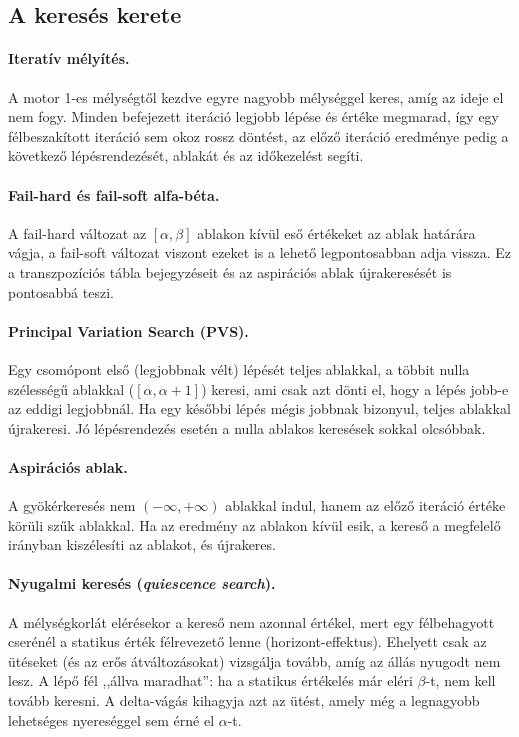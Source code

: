 \subsection{A keresés kerete}

\paragraph{Iteratív mélyítés.} A motor 1-es mélységtől kezdve egyre nagyobb mélységgel keres, amíg az ideje el nem fogy. Minden befejezett iteráció legjobb lépése és értéke megmarad, így egy félbeszakított iteráció sem okoz rossz döntést, az előző iteráció eredménye pedig a következő lépésrendezését, ablakát és az időkezelést segíti.

\paragraph{Fail-hard és fail-soft alfa-béta.} A fail-hard változat az $[\alpha, \beta]$ ablakon kívül eső értékeket az ablak határára vágja, a fail-soft változat viszont ezeket is a lehető legpontosabban adja vissza. Ez a transzpozíciós tábla bejegyzéseit és az aspirációs ablak újrakeresését is pontosabbá teszi.

\paragraph{Principal Variation Search (PVS).} Egy csomópont első (legjobbnak vélt) lépését teljes ablakkal, a többit nulla szélességű ablakkal ($[\alpha, \alpha+1]$) keresi, ami csak azt dönti el, hogy a lépés jobb-e az eddigi legjobbnál. Ha egy későbbi lépés mégis jobbnak bizonyul, teljes ablakkal újrakeresi. Jó lépésrendezés esetén a nulla ablakos keresések sokkal olcsóbbak.

\paragraph{Aspirációs ablak.} A gyökérkeresés nem $(-\infty, +\infty)$ ablakkal indul, hanem az előző iteráció értéke körüli szűk ablakkal. Ha az eredmény az ablakon kívül esik, a kereső a megfelelő irányban kiszélesíti az ablakot, és újrakeres.

\paragraph{Nyugalmi keresés (\emph{quiescence search}).} A mélységkorlát elérésekor a kereső nem azonnal értékel, mert egy félbehagyott cserénél a statikus érték félrevezető lenne (horizont-effektus). Ehelyett csak az ütéseket (és az erős átváltozásokat) vizsgálja tovább, amíg az állás nyugodt nem lesz. A lépő fél ,,állva maradhat'': ha a statikus értékelés már eléri $\beta$-t, nem kell tovább keresni. A delta-vágás kihagyja azt az ütést, amely még a legnagyobb lehetséges nyereséggel sem érné el $\alpha$-t.


